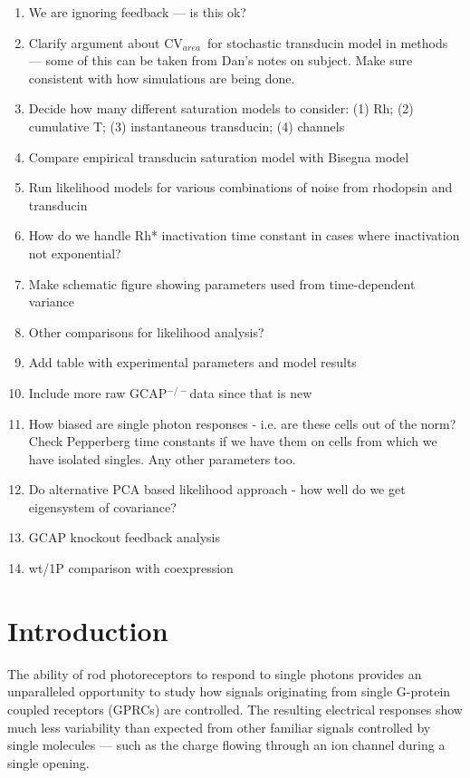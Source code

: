 \documentclass[12pt]{article}
\def\i{\item}
\def\be{\begin{enumerate}}
\def\ee{\end{enumerate}}
\def\GCAPKO{GCAP$^{-/-}$}
\def\CVArea{CV$_{area}$~}
\begin{document}
\baselineskip 18pt


\be

\i{We are ignoring feedback --- is this ok?}

\i{Clarify argument about \CVArea for stochastic transducin model in methods --- some of this can be taken from Dan's notes on subject.  Make sure consistent with how simulations are being done.}

\i{Decide how many different saturation models to consider: (1) Rh; (2) cumulative T; (3) instantaneous transducin; (4) channels}

\i{Compare empirical transducin saturation model with Bisegna model}

\i{Run likelihood models for various combinations of noise from rhodopsin and transducin}

\i{How do we handle Rh* inactivation time constant in cases where inactivation not exponential?}

\i{Make schematic figure showing parameters used from time-dependent variance}

\i{Other comparisons for likelihood analysis?}

\i{Add table with experimental parameters and model results}

\i{Include more raw \GCAPKO data since that is new}

\i{How biased are single photon responses - i.e. are these cells out of the norm?  Check Pepperberg time constants if we have them on cells from which we have isolated singles.  Any other parameters too.}

\i{Do alternative PCA based likelihood approach - how well do we get eigensystem of covariance?}

\i{GCAP knockout feedback analysis}

\i{wt/1P comparison with coexpression}

\ee


\vfill\eject
\section{Introduction}

The ability of rod photoreceptors to respond to single photons provides an unparalleled opportunity to study how signals originating from single G-protein coupled receptors (GPRCs) are controlled.  The resulting electrical responses show much less variability than expected from other familiar signals controlled by single molecules --- such as the charge flowing through an ion channel during a single opening.  
\end{document}
